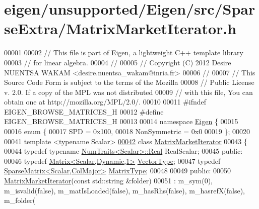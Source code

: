 \hypertarget{eigen_2unsupported_2_eigen_2src_2_sparse_extra_2_matrix_market_iterator_8h_source}{}\section{eigen/unsupported/\+Eigen/src/\+Sparse\+Extra/\+Matrix\+Market\+Iterator.h}
\label{eigen_2unsupported_2_eigen_2src_2_sparse_extra_2_matrix_market_iterator_8h_source}

\begin{DoxyCode}
00001 
00002 \textcolor{comment}{// This file is part of Eigen, a lightweight C++ template library}
00003 \textcolor{comment}{// for linear algebra.}
00004 \textcolor{comment}{//}
00005 \textcolor{comment}{// Copyright (C) 2012 Desire NUENTSA WAKAM <desire.nuentsa\_wakam@inria.fr>}
00006 \textcolor{comment}{//}
00007 \textcolor{comment}{// This Source Code Form is subject to the terms of the Mozilla}
00008 \textcolor{comment}{// Public License v. 2.0. If a copy of the MPL was not distributed}
00009 \textcolor{comment}{// with this file, You can obtain one at http://mozilla.org/MPL/2.0/.}
00010 
00011 \textcolor{preprocessor}{#ifndef EIGEN\_BROWSE\_MATRICES\_H}
00012 \textcolor{preprocessor}{#define EIGEN\_BROWSE\_MATRICES\_H}
00013 
00014 \textcolor{keyword}{namespace }\hyperlink{namespace_eigen}{Eigen} \{
00015 
00016 \textcolor{keyword}{enum} \{
00017   SPD = 0x100,
00018   NonSymmetric = 0x0
00019 \}; 
00020 
00041 \textcolor{keyword}{template} <\textcolor{keyword}{typename} Scalar>
\hyperlink{class_eigen_1_1_matrix_market_iterator}{00042} \textcolor{keyword}{class }\hyperlink{class_eigen_1_1_matrix_market_iterator}{MatrixMarketIterator} 
00043 \{
00044     \textcolor{keyword}{typedef} \textcolor{keyword}{typename} \hyperlink{group___core___module_struct_eigen_1_1_num_traits}{NumTraits<Scalar>::Real} RealScalar;
00045   \textcolor{keyword}{public}:
00046     \textcolor{keyword}{typedef} \hyperlink{group___core___module}{Matrix<Scalar,Dynamic,1>} \hyperlink{group___core___module}{VectorType}; 
00047     \textcolor{keyword}{typedef} \hyperlink{group___sparse_core___module}{SparseMatrix<Scalar,ColMajor>} 
      \hyperlink{group___sparse_core___module}{MatrixType}; 
00048   
00049   \textcolor{keyword}{public}:
00050     \hyperlink{class_eigen_1_1_matrix_market_iterator}{MatrixMarketIterator}(\textcolor{keyword}{const} std::string &folder)
00051       : m\_sym(0), m\_isvalid(\textcolor{keyword}{false}), m\_matIsLoaded(\textcolor{keyword}{false}), m\_hasRhs(\textcolor{keyword}{false}), m\_hasrefX(\textcolor{keyword}{false}), m\_folder(

\end{DoxyCode}
